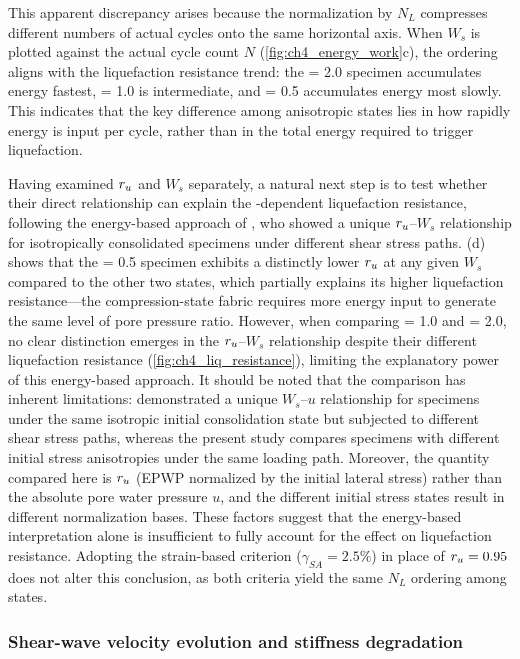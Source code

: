 \documentclass[../main]{subfiles}
\begin{document}
This apparent discrepancy arises because the normalization by $N_L$ compresses different numbers of actual cycles onto the same horizontal axis. When $W_s$ is plotted against the actual cycle count $N$ (\cref{fig:ch4_energy_work}c), the ordering aligns with the liquefaction resistance trend: the \Kzero{} = 2.0 specimen accumulates energy fastest, \Kzero{} = 1.0 is intermediate, and \Kzero{} = 0.5 accumulates energy most slowly. This indicates that the key difference among anisotropic states lies in how rapidly energy is input per cycle, rather than in the total energy required to trigger liquefaction.

Having examined $r_u$ and $W_s$ separately, a natural next step is to test whether their direct relationship can explain the \Kzero{}-dependent liquefaction resistance, following the energy-based approach of \citet{TowhataIshihara1985}, who showed a unique $r_u$--$W_s$ relationship for isotropically consolidated specimens under different shear stress paths. (d) shows that the \Kzero{} = 0.5 specimen exhibits a distinctly lower $r_u$ at any given $W_s$ compared to the other two states, which partially explains its higher liquefaction resistance---the compression-state fabric requires more energy input to generate the same level of pore pressure ratio. However, when comparing \Kzero{} = 1.0 and \Kzero{} = 2.0, no clear distinction emerges in the $r_u$--$W_s$ relationship despite their different liquefaction resistance (\cref{fig:ch4_liq_resistance}), limiting the explanatory power of this energy-based approach. It should be noted that the comparison has inherent limitations: \citet{TowhataIshihara1985} demonstrated a unique $W_s$--$u$ relationship for specimens under the same isotropic initial consolidation state but subjected to different shear stress paths, whereas the present study compares specimens with different initial stress anisotropies under the same loading path. Moreover, the quantity compared here is $r_u$ (EPWP normalized by the initial lateral stress) rather than the absolute pore water pressure $u$, and the different initial stress states result in different normalization bases. These factors suggest that the energy-based interpretation alone is insufficient to fully account for the \Kzero{} effect on liquefaction resistance. Adopting the strain-based criterion ($\gamma_{SA}=2.5\%$) in place of $r_u=0.95$ does not alter this conclusion, as both criteria yield the same $N_L$ ordering among \Kzero{} states.

\subsubsection{Shear-wave velocity evolution and stiffness degradation}
\end{document}
